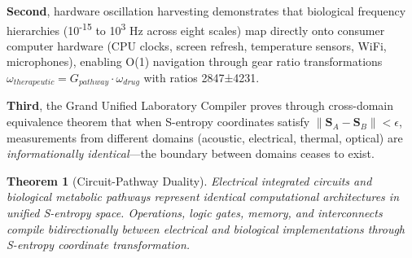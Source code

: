 \documentclass[11pt,a4paper]{article}
\newtheorem{theorem}{Theorem}[section]
\begin{document}
\textbf{Second}, hardware oscillation harvesting demonstrates that biological frequency hierarchies (10\textsuperscript{-15} to 10\textsuperscript{3} Hz across eight scales) map directly onto consumer computer hardware (CPU clocks, screen refresh, temperature sensors, WiFi, microphones), enabling O(1) navigation through gear ratio transformations $\omega_{therapeutic} = G_{pathway} \cdot \omega_{drug}$ with ratios 2847±4231\cite{hardware_lipid_llm}.

\textbf{Third}, the Grand Unified Laboratory Compiler proves through cross-domain equivalence theorem that when S-entropy coordinates satisfy $\|\mathbf{S}_A - \mathbf{S}_B\| < \epsilon$, measurements from different domains (acoustic, electrical, thermal, optical) are \textit{informationally identical}—the boundary between domains ceases to exist\cite{grand_unification_lab}.

\begin{theorem}[Circuit-Pathway Duality]
Electrical integrated circuits and biological metabolic pathways represent identical computational architectures in unified S-entropy space. Operations, logic gates, memory, and interconnects compile bidirectionally between electrical and biological implementations through S-entropy coordinate transformation.
\end{theorem}
\end{document}

